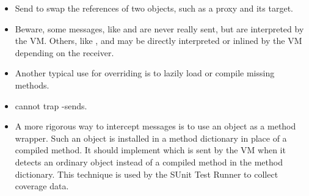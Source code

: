 \documentclass[a4paper,10pt,twoside]{book}
\begin{document}
\begin{itemize}
\item Send  to swap the references of two objects, such as a proxy and its target.
\item Beware, some messages, like  and  are never really sent, but are interpreted by the VM.  Others, like \ct{+}, \ct{-} and  may be directly interpreted or inlined by the VM depending on the receiver.
\item Another typical use for overriding  is to lazily load or compile missing methods.
\item {} cannot trap \self-sends.
\item A more rigorous way to intercept messages is to use an object as a method wrapper. Such an object is installed in a method dictionary in place of a compiled method. It should implement  which is sent by the VM when it detects an ordinary object instead of a compiled method in the method dictionary. This technique is used by the SUnit Test Runner to collect coverage data.
\end{itemize}

\ifx\wholebook\relax\else
   
   
\end{document}
